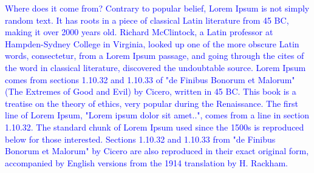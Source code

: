 \documentclass[a4paper,12pt,twoside]{report}
\begin{document}
	\pagestyle{fancy}
	\fancyhf{}
	\centering{\huge{\textcolor{red}{Lorem Ipsum}}}\par
	
	\setlength{\parindent}{2cm}
		\raggedleft{\textit{\textcolor{green}{What is Lorem Ipsum? Lorem Ipsum is simply dummy text of the printing and typesetting industry. Lorem Ipsum has been the industry's standard dummy text ever since the 1500s, when an unknown printer took a galley of type and scrambled it to make a type specimen book. It has survived not only five centuries, but also the leap into electronic typesetting, remaining essentially unchanged. It was popularised in the 1960s with the release of Letraset sheets containing Lorem Ipsum passages, and more recently with desktop publishing software like Aldus PageMaker including versions of Lorem Ipsum.}}}\par
		\raggedright{\textcolor{blue}{Where does it come from? Contrary to popular belief, Lorem Ipsum is not simply random text. It has roots in a piece of classical Latin literature from 45 BC, making it over 2000 years old. Richard McClintock, a Latin professor at Hampden-Sydney College in Virginia, looked up one of the more obscure Latin words, consectetur, from a Lorem Ipsum passage, and going through the cites of the word in classical literature, discovered the undoubtable source. Lorem Ipsum comes from sections 1.10.32 and 1.10.33 of "de Finibus Bonorum et Malorum" (The Extremes of Good and Evil) by Cicero, written in 45 BC. This book is a treatise on the theory of ethics, very popular during the Renaissance. The first line of Lorem Ipsum, "Lorem ipsum dolor sit amet..", comes from a line in section 1.10.32. The standard chunk of Lorem Ipsum used since the 1500s is reproduced below for those interested. Sections 1.10.32 and 1.10.33 from "de Finibus Bonorum et Malorum" by Cicero are also reproduced in their exact original form, accompanied by English versions from the 1914 translation by H. Rackham.}}\par
\end{document}
